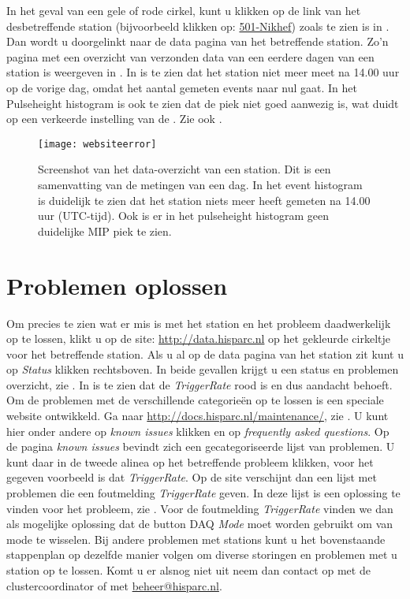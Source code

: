In het geval van een gele of rode cirkel, kunt u klikken op de link van
het desbetreffende station (bijvoorbeeld klikken op:
\underline{501-Nikhef}) zoals te zien is in . Dan
wordt u doorgelinkt naar de data pagina van het betreffende station.
Zo'n pagina met een overzicht van verzonden data van een eerdere dagen
van een station is weergeven in . In
 is te zien dat het station niet meer meet na
14.00 uur op de vorige dag,  omdat het aantal gemeten events naar nul
gaat. In het Pulseheight histogram is ook te zien dat de \mip piek niet
goed aanwezig is, wat duidt op een verkeerde instelling van de \pmt. Zie
ook \cite{inregelen}.

\begin{figure} 
    \centering 
    \texttt{[image: websiteerror]}
    \caption{Screenshot van het data-overzicht van een station. Dit is
             een samenvatting van de metingen van een dag. In het event
             histogram is duidelijk te zien dat het station niets meer
             heeft gemeten na 14.00 uur (UTC-tijd). Ook is er in het
             pulseheight histogram geen duidelijke MIP piek te zien.}
    \label{fig:websiteerror} 
\end{figure}


\section{Problemen oplossen}

Om precies te zien wat er mis is met het station en het probleem
daadwerkelijk op te lossen, klikt u op de site:
\url{http://data.hisparc.nl} op het gekleurde cirkeltje voor het
betreffende station. Als u al op de data pagina van het station zit kunt
u op \emph{Status} klikken rechtsboven. In beide gevallen krijgt u een
status en problemen overzicht, zie . In
 is te zien dat de \emph{TriggerRate} rood is
en dus aandacht behoeft. Om de problemen met de verschillende
categorieën op te lossen is een speciale website ontwikkeld. Ga naar
\url{http://docs.hisparc.nl/maintenance/}, zie .
U kunt hier onder andere op \emph{known issues} klikken en op
\emph{frequently asked questions}. Op de pagina \emph{known issues}
bevindt zich een gecategoriseerde lijst van problemen. U kunt daar in de
tweede alinea op het betreffende probleem klikken, voor het gegeven
voorbeeld is dat \emph{TriggerRate}. Op de site verschijnt dan een lijst
met problemen die een foutmelding \emph{TriggerRate} geven. In deze
lijst is een oplossing te vinden voor het probleem, zie
. Voor de foutmelding \emph{TriggerRate} vinden we
dan als mogelijke oplossing dat de button DAQ \emph{Mode} moet worden
gebruikt om van mode te wisselen. Bij andere problemen met stations kunt
u het bovenstaande stappenplan op dezelfde manier volgen om diverse
storingen en problemen met u station op te lossen. Komt u er alsnog niet
uit neem dan contact op met de clustercoordinator of met
\url{beheer@hisparc.nl}.
 

